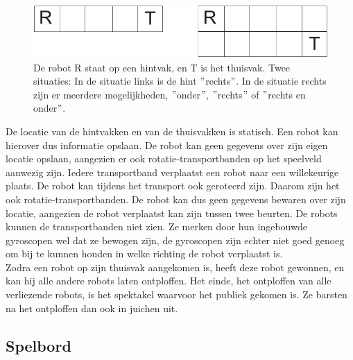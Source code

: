\begin{figure}
\includegraphics{plaatjes.pdf}
\caption{De robot R staat op een hintvak, en T is het thuisvak. Twee situaties: In de situatie links is de hint $"$rechts$"$. In de situatie rechts zijn er meerdere mogelijkheden, $"$onder$"$, $"$rechts$"$ of $"$rechts en onder$"$.}
\label{hintvakken}
\end{figure}

De locatie van de hintvakken en van de thuisvakken is statisch. Een robot kan hierover dus informatie opslaan. De robot kan geen gegevens over zijn eigen locatie opslaan, aangezien er ook rotatie-transportbanden op het speelveld aanwezig zijn. Iedere transportband verplaatst een robot naar een willekeurige plaats. De robot kan tijdens het transport ook geroteerd zijn. Daarom zijn het ook rotatie-transportbanden. De robot kan dus geen gegevens bewaren over zijn locatie, aangezien de robot verplaatst kan zijn tussen twee beurten. De robots kunnen de transportbanden niet zien. Ze merken door hun ingebouwde gyroscopen wel dat ze bewogen zijn, de gyroscopen zijn echter niet goed genoeg om bij te kunnen houden in welke richting de robot verplaatst is.\\
Zodra een robot op zijn thuisvak aangekomen is, heeft deze robot gewonnen, en kan hij alle andere robots laten ontploffen. Het einde, het ontploffen van alle verliezende robots, is het spektakel waarvoor het publiek gekomen is. Ze barsten na het ontploffen dan ook in juichen uit.

\subsection{Spelbord}

